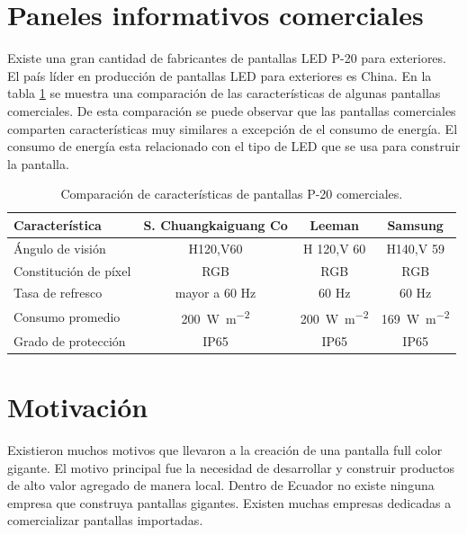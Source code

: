 \section{Paneles informativos comerciales}
Existe una gran cantidad de fabricantes de pantallas LED P-20 para exteriores. El país líder en producción de pantallas LED para exteriores es China. En la tabla \ref{tab:comercial} se muestra una comparación de las características de algunas pantallas comerciales. De esta comparación se puede observar que las pantallas comerciales comparten características muy similares a excepción de el consumo de energía. El consumo de energía esta relacionado con el tipo de LED que se usa para construir la pantalla. 

\begin{table}[h]
\centering
\caption[Comparación entre pantallas P-20]{Comparación de características de pantallas P-20 comerciales.}
\begin{tabular}{l c c c}
\toprule
\textbf{Característica} & \textbf{S. Chuangkaiguang Co \citep{TABLAREF1}} & \textbf{Leeman \citep{TABLAREF2}} & \textbf{Samsung \citep{TABLAREF3}} \\
\midrule 

Ángulo de visión        & H120,V60 & H 120,V 60 & H140,V 59 \\
Constitución de píxel   & RGB & RGB & RGB \\
Tasa de refresco        & mayor a 60 Hz & 60 Hz & 60 Hz \\
Consumo promedio        & \SI{200}{\watt\per\meter\squared} & \SI{200}{\watt\per\meter\squared} & \SI{169}{\watt\per\meter\squared} \\
Grado de protección     & IP65 & IP65 & IP65 \\

\bottomrule
\hline
\end{tabular}
\label{tab:comercial}
\end{table}





\section{Motivación}
Existieron muchos motivos que llevaron a la creación de una pantalla full color gigante. El motivo principal fue la necesidad de desarrollar y construir productos de alto valor agregado de manera local. Dentro de Ecuador no existe ninguna empresa que construya pantallas gigantes. Existen muchas empresas dedicadas a comercializar pantallas importadas. 

